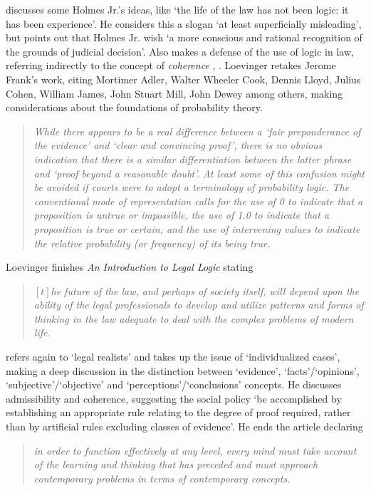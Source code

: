 \documentclass[a4paper]{exam}
\theoremstyle{plain}
\begin{document}
\cite{loevinger1952introduction} discusses some Holmes Jr.'s ideas, like `the life of the law has not been logic: it has been experience'. He considers this a slogan `at least superficially misleading', but points out that Holmes Jr. wish `a more conscious and rational recognition of the grounds of judicial decision'. Also makes a defense of the use of logic in law, referring indirectly to the concept of \textit{coherence} \cite{leonard1980roles}, \cite{loschi2002coherence}. Loevinger retakes Jerome Frank's work, citing Mortimer Adler, Walter Wheeler Cook, Dennis Lloyd, Julius Cohen, William James, John Stuart Mill, John Dewey among others, making considerations about the foundations of probability theory.
\begin{quote}
\textit{While there appears to be a real difference between a `fair preponderance of the evidence' and `clear and convincing proof', there is no obvious indication that there is a similar differentiation between the latter phrase and `proof beyond a reasonable doubt'. At least some of this confusion might be avoided if courts were to adopt a terminology of probability logic. The conventional mode of representation calls for the use of 0 to indicate that a proposition is untrue or impossible, the use of 1.0 to indicate that a proposition is true or certain, and the use of intervening values to indicate the relative probability (or frequency) of its being true.} \cite[p. 495]{loevinger1952introduction}
\end{quote}

Loevinger finishes \textit{An Introduction to Legal Logic} stating
\begin{quote}
\textit{$\left[t\right]$he future of the law, and perhaps of society itself, will depend upon the ability of the legal professionals to develop and utilize patterns and forms of thinking in the law adequate to deal with the complex problems of modern life.} \cite[p. 522]{loevinger1952introduction}
\end{quote} 

\cite{loevinger1958facts} refers again to `legal realists' and takes up the issue of `individualized cases', making a deep discussion in the distinction between `evidence', `facts'/`opinions', `subjective'/`objective' and `perceptions'/`conclusions' concepts. He discusses admissibility and coherence, suggesting the social policy `be accomplished by establishing an appropriate rule relating to the degree of proof required, rather than by artificial rules excluding classes of evidence'. He ends the article declaring 
\begin{quote}
\textit{in order to function effectively at any level, every mind must take account of the learning and thinking that has preceded and must approach contemporary problems in terms of contemporary concepts.} \cite[p. 175]{loevinger1958facts}
\end{quote}
\end{document}
